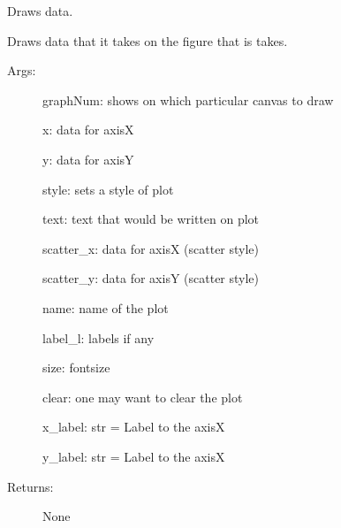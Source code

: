 \documentclass[letterpaper,10pt,english]{sphinxmanual}
\begin{document}
\begin{fulllineitems}
\label{\detokenize{GUI:GUI.draw_data}}
Draws data.

Draws data that it takes on the figure that is takes.
\begin{description}
\item[{Args:}] \leavevmode
graphNum: shows on which particular canvas to draw

x: data for axis\sphinxhyphen{}X

y: data for axis\sphinxhyphen{}Y

style: sets a style of plot

text: text that would be written on plot

scatter\_x: data for axis\sphinxhyphen{}X (scatter style)

scatter\_y: data for axis\sphinxhyphen{}Y (scatter style)

name: name of the plot

label\_l: labels if any

size: fontsize

clear: one may want to clear the plot

x\_label: str = Label to the axis\sphinxhyphen{}X

y\_label: str = Label to the axis\sphinxhyphen{}X

\item[{Returns:}] \leavevmode
None

\end{description}

\end{fulllineitems}

\end{document}
